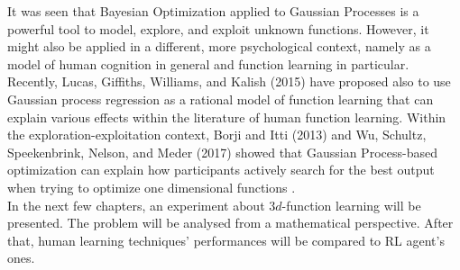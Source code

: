 It was seen that Bayesian Optimization applied to Gaussian Processes is a powerful tool to model, explore, and exploit unknown functions. However, it might also be applied in a different, more psychological context, namely as a model of human cognition in general and function learning in particular. Recently, Lucas, Giffiths, Williams, and Kalish (2015) have proposed also to use Gaussian process regression as a rational model of function learning that can explain various effects within the literature of human function learning. Within the exploration-exploitation context, Borji and Itti (2013) and Wu, Schultz, Speekenbrink, Nelson, and Meder (2017) showed that Gaussian Process-based optimization can explain how participants actively search for the best output when trying to optimize one dimensional functions \cite{Schulz095190}.\\

In the next few chapters, an experiment about $3d$-function learning will be presented. The problem will be analysed from a mathematical perspective. After that, human learning techniques' performances will be compared to RL agent's ones. 